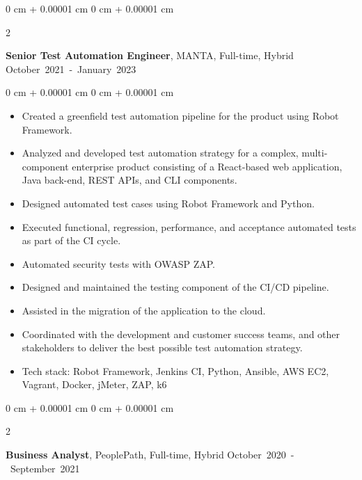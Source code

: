 \documentclass[10pt, a4paper]{article}
\newenvironment{highlights}{
    \begin{itemize}[
        topsep=0.05 cm,
        parsep=0.05 cm,
        partopsep=0pt,
        itemsep=0pt,
        leftmargin=0 cm + 10pt
    ]
}{
    \end{itemize}
} %
\newenvironment{onecolentry}{
    \begin{adjustwidth}{
        0 cm + 0.00001 cm
    }{
        0 cm + 0.00001 cm
    }
}{
    \end{adjustwidth}
} %
\newenvironment{twocolentry}[2][]{
    \onecolentry
    \def\secondColumn{#2}
    \setcolumnwidth{\fill, 4.5 cm}
    \begin{paracol}{2}
}{
    \switchcolumn \raggedleft \secondColumn
    \end{paracol}
    \endonecolentry
} %
\begin{document}
        \vspace{0.5 cm}

        \begin{twocolentry}{
            \small\mbox{October 2021 - January 2023}
        }
            \textbf{Senior Test Automation Engineer}, MANTA, Full-time, Hybrid\end{twocolentry}

        \vspace{0.10 cm}
        \begin{onecolentry}
            \begin{highlights}
                \item Created a greenfield test automation pipeline for the product using Robot Framework.
                \item Analyzed and developed test automation strategy for a complex, multi-component enterprise product consisting of a React-based web application, Java back-end, REST APIs, and CLI components.
                \item Designed automated test cases using Robot Framework and Python.
                \item Executed functional, regression, performance, and acceptance automated tests as part of the CI cycle.
                \item Automated security tests with OWASP ZAP.
                \item Designed and maintained the testing component of the CI/CD pipeline.
                \item Assisted in the migration of the application to the cloud.
                \item Coordinated with the development and customer success teams, and other stakeholders to deliver the best possible test automation strategy.
                \item Tech stack: Robot Framework, Jenkins CI, Python, Ansible, AWS EC2, Vagrant, Docker, jMeter, ZAP, k6
            \end{highlights}
        \end{onecolentry}

        \vspace{0.5 cm}

        \begin{twocolentry}{
            \small\mbox{October 2020 - September 2021}
        }
            \textbf{Business Analyst}, PeoplePath, Full-time, Hybrid\end{twocolentry}
\end{document}
